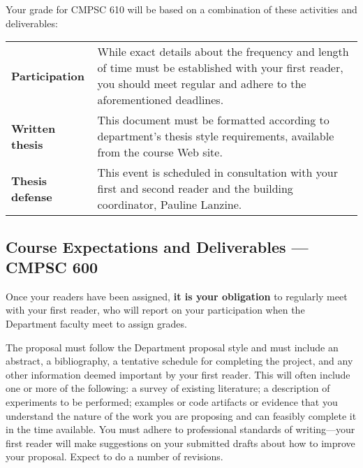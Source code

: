 \vspace*{-.1in}
\noindent
Your grade for CMPSC 610 will be based on a combination of these activities and deliverables:
\begin{center}
\begin{tabular}{lp{4in}}
\bf Participation & While exact details about the frequency and length of time must be established with your first
reader, you should meet regular and adhere to the aforementioned deadlines. \\ 

\bf Written thesis & This document must be formatted according to department's thesis style requirements, available from
the course Web site. \\

\bf Thesis defense & This event is scheduled in consultation with your first and second reader and the building
coordinator, Pauline Lanzine. \\

% 
\end{tabular}
\end{center}

\subsection*{Course Expectations and Deliverables --- CMPSC 600}

\medskip
{}
Once your readers have been assigned,
{\bf it is your obligation} to regularly meet with your first reader,
who will report on your participation when the Department faculty
meet to assign grades.

\medskip
{}
The proposal  must follow the Department proposal style and must include
an abstract, a bibliography, a tentative schedule for completing the
project, and any other information deemed important by your first
reader. This will often include one or more of the following:
a survey of existing literature;
a description of experiments to be performed;
examples or code artifacts or evidence that you understand the
nature of the work you are proposing and can feasibly complete it
in the time available. You must adhere to professional standards of
writing---your first reader will make suggestions on your submitted
drafts about how to improve your proposal.
Expect to do a number of revisions.

